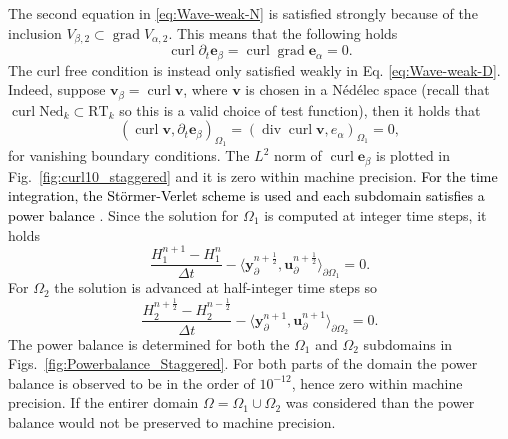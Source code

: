 \documentclass[11pt,a4paper]{article}
\DeclareMathOperator*{\grad}{grad}
\renewcommand{\div}{\operatorname{div}}
\DeclareMathOperator*{\curl}{curl}
\newcommand{\innerproduct}[3][\Omega]{(#2, #3)_{#1}}
\newcommand{\boundary}[3][\partial\Omega]{\langle #2, #3\rangle_{#1}}
\newcommand{\revone}[1]{{\textcolor{black}{#1}}}
\begin{document}
The second equation in \eqref{eq:Wave-weak-N} is satisfied strongly because of the inclusion $V_{\beta, 2} \subset \grad V_{\alpha, 2}$. This means that the following holds
$$\curl\partial_t \bm{e}_\beta=\curl\grad \bm{e}_\alpha=0.$$ 
The curl free condition is instead only satisfied weakly in Eq. \eqref{eq:Wave-weak-D}. Indeed, suppose $\bm{v}_\beta = \curl \bm{v}$, where $\bm{v}$ is chosen in a N\'ed\'elec space (recall that $\curl \mathrm{Ned}_k \subset \mathrm{RT}_k$ so this is a valid choice of test function), then it holds that
$$
\innerproduct[\Omega_1]{\curl \bm{v}}{\partial_t\bm{e}_\beta} = \innerproduct[\Omega_1]{\div\curl \bm{v}}{{e}_\alpha} = 0,
$$
for vanishing boundary conditions. The $L^2$ norm of $\curl \bm{e}_\beta$ is plotted in Fig.~\ref{fig:curl10_staggered} and it is zero within machine precision. 
\revone{For the time integration, the St\"ormer-Verlet scheme is used and each subdomain satisfies a power balance \cite{kotyczka2019discrete}}. Since the solution for $\Omega_1$ is computed at integer time steps, it holds
$$
\frac{{H}_1^{n+1} - H_1^n}{\Delta t} - \boundary[\partial\Omega_1]{\mathbf{y}_\partial^{n+\frac{1}{2}}}{\mathbf{u}_\partial^{n+\frac{1}{2}}} = 0.
$$
For $\Omega_2$ the solution is advanced at half-integer time steps so
$$
\frac{{H}_2^{n+\frac{1}{2}} - H_2^{n-\frac{1}{2}}}{\Delta t} - \boundary[\partial\Omega_2]{\mathbf{y}_\partial^{n+1}}{\mathbf{u}_\partial^{n+1}} = 0.
$$
The power balance is determined for both the $\Omega_1$ and $\Omega_2$ subdomains in Figs.~\ref{fig:Powerbalance_Staggered}. For both parts of the domain the power balance is observed to be in the order of $10^{-12}$, hence zero within machine precision. If the entirer domain $\Omega= \Omega_1 \cup \Omega_2$ was considered than the power balance would not be preserved to machine precision. 
\end{document}
